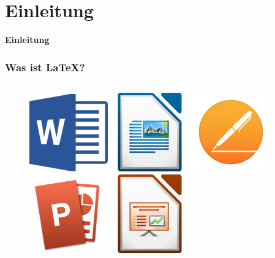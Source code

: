 \documentclass["WS\space 16-17\space -\space LaTeX-Kurs\space -\space Praesentation\space -\space 1.tex"]{subfiles}
\begin{document}
%
\section{Einleitung}

\begin{frame}[c]
	\begin{center}
		\LARGE \textbf{Einleitung}
	\end{center}
\end{frame}


\begin{frame}[fragile]
  \frametitle{Was ist \LaTeX?}

  \vspace{-12pt}
  \begin{columns}
    
    \begin{column}{0.5\textwidth}
      \begin{figure}
        \centering
        \includegraphics[width=0.1\linewidth]{img/MSWord.png}
        \includegraphics[width=0.1\linewidth]{img/LOWriter.png}
        \includegraphics[width=0.1\linewidth]{img/APages.png}
        \includegraphics[width=0.1\linewidth]{img/MSPowerPoint.png}
        \includegraphics[width=0.1\linewidth]{img/LOImpress_svg.png}
        \label{fig:icons}
      \end{figure}
    \end{column}
    

\end{columns}
\end{frame}
\end{document}
